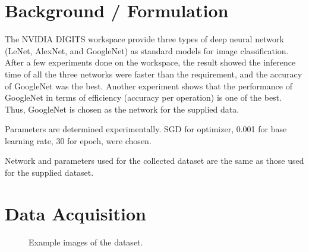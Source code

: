 \documentclass[10pt,journal,compsoc]{IEEEtran}
\begin{document}
\section{Background / Formulation}
The NVIDIA DIGITS workspace provide three types of deep neural network (LeNet, AlexNet, and GoogleNet) as standard models for image classification. After a few experiments done on the workspace, the result showed the inference time of all the three networks were faster than the requirement, and the accuracy of GoogleNet was the best. Another experiment shows that the performance of GoogleNet in terms of efficiency (accuracy per operation) is one of the best. \cite{DBLP:journals/corr/CanzianiPC16} Thus, GoogleNet is chosen as the network for the supplied data.

Parameters are determined experimentally. SGD for optimizer, 0.001 for base learning rate, 30 for epoch, were chosen.

Network and parameters used for the collected dataset are the same as those used for the supplied dataset.

\section{Data Acquisition}

\begin{figure}[thpb]
      \centering
      \vfill
      \caption{Example images of the dataset.}
\end{figure}
\end{document}
